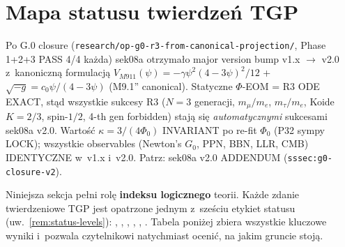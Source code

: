 %
\section{Mapa statusu twierdze\'n TGP}\label{sec:status-map}

\begin{center}
\end{center}

\begin{remark}\label{rem:status-map-G0}
Po G.0 closure (\texttt{research/op-g0-r3-from-canonical-projection/},
Phase 1+2+3 PASS 4/4 ka\.zda) sek08a otrzyma\l{}o major version bump
v1.x $\to$ v2.0 z~kanoniczn\k{a} formulacj\k{a} $V_{M911}(\psi) =
-\gamma\psi^2(4-3\psi)^2/12$ + $\sqrt{-g} = c_0\psi/(4-3\psi)$ (M9.1''
canonical). Statyczne $\Phi$-EOM = R3 ODE EXACT, st\k{a}d wszystkie
sukcesy R3 ($N=3$ generacji, $m_\mu/m_e$, $m_\tau/m_e$, Koide $K=2/3$,
spin-$1/2$, 4-th gen forbidden) staj\k{a} si\k{e} \emph{automatycznymi}
sukcesami sek08a v2.0. Warto\'s\'c $\kappa = 3/(4\Phi_0)$ INVARIANT
po re-fit $\Phi_0$ (P32 sympy LOCK); wszystkie observables (Newton's
$G_0$, PPN, BBN, LLR, CMB) IDENTYCZNE w~v1.x i~v2.0. Patrz:
sek08a v2.0 ADDENDUM (\texttt{sssec:g0-closure-v2}).
\end{remark}

\begin{remark}\label{rem:status-map-intro}
Niniejsza sekcja pe\l{}ni rol\k{e} \textbf{indeksu logicznego} teorii.
Ka\.zde zdanie twierdzeniowe TGP jest opatrzone jednym z~sze\'sciu
etykiet statusu (uw.~\ref{rem:status-levels}):
,
,
,
,
,
.
Tabela poni\.zej zbiera wszystkie kluczowe wyniki
i~pozwala czytelnikowi natychmiast oceni\'c,
na jakim gruncie stoj\k{a}.
\end{remark}

